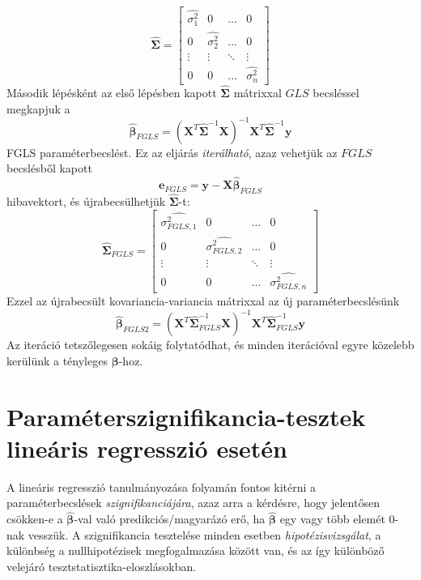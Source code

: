 \documentclass[14p]{report}
\def\pmb{\boldsymbol}
\def\ebeta{\hat{\pmb{\beta}}}
\begin{document}
	\[
		\widehat{\pmb{\Sigma}} = 
		\begin{bmatrix}
			\widehat{\sigma_1^2} & 0 & \dots & 0 \\
			0 & \widehat{\sigma_2^2} & \dots & 0 \\
			\vdots & \vdots & \ddots & \vdots \\
			0 & 0 & \dots & \widehat{\sigma_n^2}
		\end{bmatrix}
	\]
	Második lépésként az első lépésben kapott $\widehat{\pmb{\Sigma}}$ mátrixxal $GLS$ becsléssel megkapjuk a
	\[
		\ebeta_{FGLS} = (\pmb{X}^T\widehat{\pmb{\Sigma}}^{-1}\pmb{X})^{-1}\pmb{X}^T\widehat{\pmb{\Sigma}}^{-1}\pmb{y}
	\]
	FGLS paraméterbecslést. Ez az eljárás \emph{iterálható}, azaz vehetjük az $FGLS$ becslésből kapott
	\[
		\pmb{e}_{FGLS} = \pmb{y} - \pmb{X}\ebeta_{FGLS}
	\]
	hibavektort, és újrabecsülhetjük $\widehat{\pmb{\Sigma}}$-t:
	\[
		\widehat{\pmb{\Sigma}}_{FGLS} =
		\begin{bmatrix}
			\widehat{\sigma_{FGLS,1}^2} & 0 & \dots & 0 \\
			0 & \widehat{\sigma_{FGLS,2}^2} & \dots & 0 \\
			\vdots & \vdots & \ddots & \vdots \\
			0 & 0 & \dots & \widehat{\sigma_{FGLS,n}^2}
		\end{bmatrix}
	\]
	Ezzel az újrabecsült kovariancia-variancia mátrixxal az új paraméterbecslésünk
	\[
		\ebeta_{FGLS2} = (\pmb{X}^T\widehat{\pmb{\Sigma}}_{FGLS}^{-1}\pmb{X})^{-1}\pmb{X}^T\widehat{\pmb{\Sigma}}_{FGLS}^{-1}\pmb{y}
	\]
	Az iteráció tetszőlegesen sokáig folytatódhat, és minden iterációval egyre közelebb kerülünk a tényleges $\pmb{\beta}$-hoz.
	
	\chapter{Paraméterszignifikancia-tesztek lineáris regresszió esetén}
	A lineáris regresszió tanulmányozása folyamán fontos kitérni a paraméterbecslések \emph{szignifikanciájára}, azaz arra a kérdésre, hogy jelentősen csökken-e a $\ebeta$-val való predikciós/magyarázó erő, ha $\ebeta$ egy vagy több elemét $0$-nak vesszük. A szignifikancia tesztelése minden esetben \emph{hipotézisvizsgálat}, a különbség a nullhipotézisek megfogalmazása között van, és az így különböző velejáró tesztstatisztika-eloszlásokban. 
	
\end{document}
